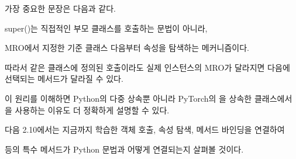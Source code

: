 가장 중요한 문장은 다음과 같다.

\begin{dhksmry}[centered]
super()는 직접적인 부모 클래스를 호출하는 문법이 아니라,

MRO에서 지정한 기준 클래스 다음부터 속성을 탐색하는 메커니즘이다.
\end{dhksmry}

따라서 같은 클래스에 정의된  호출이라도 실제 인스턴스의 MRO가 달라지면 다음에 선택되는 메서드가 달라질 수 있다.

이 원리를 이해하면 Python의 다중 상속뿐 아니라 PyTorch의 을 상속한 클래스에서 을 사용하는 이유도 더 정확하게 설명할 수 있다.

다음 2.10에서는 지금까지 학습한 객체 호출, 속성 탐색, 메서드 바인딩을 연결하여

 등의 특수 메서드가 Python 문법과 어떻게 연결되는지 살펴볼 것이다.
